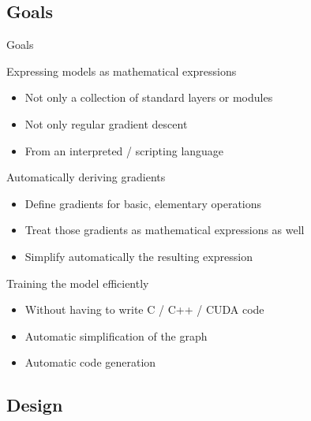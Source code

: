 \documentclass[a4paper,9pt]{beamer}
\begin{document}
\subsection{Goals}

\begin{frame}{Goals}

  \begin{block}{Expressing models as mathematical expressions}
  \begin{itemize}
    \item Not only a collection of standard layers or modules
    \item Not only regular gradient descent
    \item From an interpreted / scripting language
  \end{itemize}
  \end{block}

  \begin{block}{Automatically deriving gradients}
  \begin{itemize}
    \item Define gradients for basic, elementary operations
    \item Treat those gradients as mathematical expressions as well
    \item Simplify automatically the resulting expression
  \end{itemize}
  \end{block}

  \begin{block}{Training the model efficiently}
  \begin{itemize}
    \item Without having to write C / C++ / CUDA code
    \item Automatic simplification of the graph
    \item Automatic code generation
  \end{itemize}
  \end{block}

\end{frame}

\subsection{Design}
\end{document}
